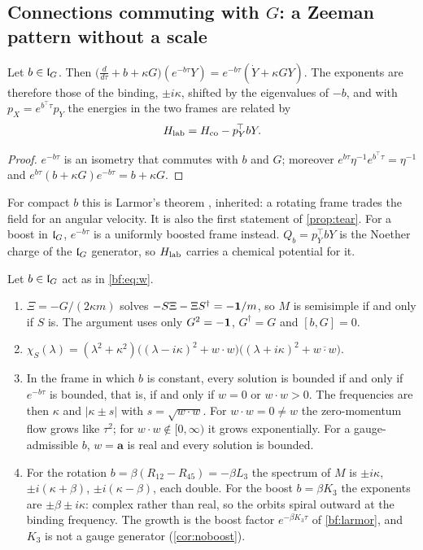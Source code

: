 \subsection{\texorpdfstring{Connections commuting with $G$: a Zeeman pattern without a scale}{Connections commuting with G: a Zeeman pattern without a scale}}
\label{sec:bf-commuting}

\begin{proposition}
\label{bf:larmor}
Let $b\in\mathfrak l_G$. Then $\bigl(\tfrac d{d\tau}+b+\kappa G\bigr)(e^{-b\tau}Y)=e^{-b\tau}(\dot Y+\kappa GY)$. The exponents are therefore those of the
binding, $\pm i\kappa$, shifted by the eigenvalues of $-b$, and with $p_X=e^{b^{\!\top}\tau}p_Y$ the energies in the two frames are related by
\[
H_{\rm lab}=H_{\rm co}-p_Y^{\!\top}bY.
\]
\end{proposition}

\begin{proof}
$e^{-b\tau}$ is an isometry that commutes with $b$ and $G$; moreover $e^{b\tau}\eta^{-1}e^{b^{\!\top}\tau}=\eta^{-1}$ and
$e^{b\tau}(b+\kappa G)e^{-b\tau}=b+\kappa G$.
\end{proof}

For compact $b$ this is Larmor's theorem \cite{Larmor1897}, inherited: a rotating frame trades the field for an angular velocity. It is also the
first statement of \cref{prop:tear}. For a boost in $\mathfrak l_G$, $e^{-b\tau}$ is a uniformly boosted frame instead. $Q_b=p_Y^{\!\top}bY$ is the Noether
charge of the $\mathfrak l_G$ generator, so $H_{\rm lab}$ carries a chemical potential for it.

\begin{theorem}
\label{bf:lG}
Let $b\in\mathfrak l_G$ act as in \eqref{bf:eq:w}.
\begin{enumerate}[label=(\roman*),leftmargin=2.2em]
\item $\Xi=-G/(2\kappa m)$ solves $-S\Xi-\Xi S^\dagger=-\mathbf 1/m$, so $M$ is semisimple if and only if $S$ is. The argument uses only $G^2=-\mathbf 1$,
$G^\dagger=G$ and $[b,G]=0$.
\item $\chi_S(\lambda)=(\lambda^2+\kappa^2)\bigl((\lambda-i\kappa)^2+w\cdot w\bigr)\bigl((\lambda+i\kappa)^2+\overline{w\cdot w}\bigr)$.
\item In the frame in which $b$ is constant, every solution is bounded if and only if $e^{-b\tau}$ is bounded, that is, if and only if $w=0$ or
$w\cdot w>0$. The frequencies are then $\kappa$ and $|\kappa\pm s|$ with $s=\sqrt{w\cdot w}$. For $w\cdot w=0\neq w$ the zero-momentum flow grows
like $\tau^2$; for $w\cdot w\notin[0,\infty)$ it grows exponentially. For a gauge-admissible $b$, $w=\mathbf a$ is real and every solution is bounded.
\item For the rotation $b=\beta(R_{12}-R_{45})=-\beta L_3$ the spectrum of $M$ is $\pm i\kappa$, $\pm i(\kappa+\beta)$, $\pm i(\kappa-\beta)$, each
double. For the boost $b=\beta K_3$ the exponents are $\pm\beta\pm i\kappa$: complex rather than real, so the orbits spiral outward at the binding
frequency. The growth is the boost factor $e^{-\beta K_3\tau}$ of \cref{bf:larmor}, and $K_3$ is not a gauge generator (\cref{cor:noboost}).
\end{enumerate}
\end{theorem}

